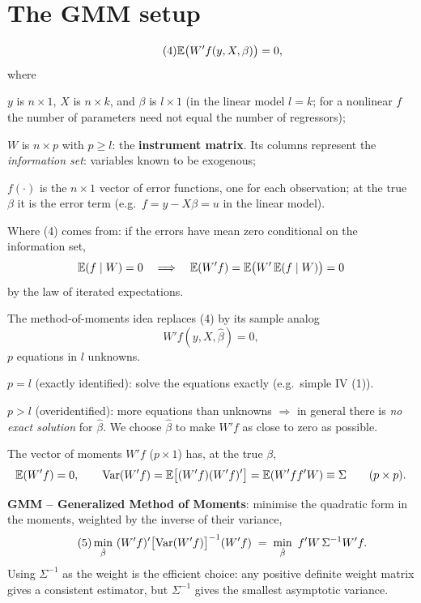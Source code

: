 \documentclass[11pt]{article}
\begin{document}
\section{The GMM setup}

\begin{equation}\tag{4}
 \mathbb{E}\bigl(W'f(y,X,\beta)\bigr)=0 ,
\end{equation}
where
\begin{flatlist}
 \item $y$ is $n\times1$, $X$ is $n\times k$, and $\beta$ is $l\times1$ (in the linear model $l=k$; for a
       nonlinear $f$ the number of parameters need not equal the number of regressors);
 \item $W$ is $n\times p$ with $p\ge l$: the \textbf{instrument matrix}. Its columns represent the
       \emph{information set}: variables known to be exogenous;
 \item $f(\cdot)$ is the $n\times1$ vector of error functions, one for each observation; at the true $\beta$ it is
       the error term (e.g.\ $f=y-X\beta=u$ in the linear model).
\end{flatlist}
Where (4) comes from: if the errors have mean zero conditional on the information set,
\[ \mathbb{E}(f\mid W)=0\quad\Longrightarrow\quad \mathbb{E}(W'f)=\mathbb{E}\bigl(W'\,\mathbb{E}(f\mid W)\bigr)=0 \]
by the law of iterated expectations.

The method-of-moments idea replaces (4) by its sample analog
\[ W'f(y,X,\hat\beta)=0 , \]
$p$ equations in $l$ unknowns.
\begin{flatlist}
 \item $p=l$ (exactly identified): solve the equations exactly (e.g.\ simple IV (1)).
 \item $p>l$ (overidentified): more equations than unknowns $\Longrightarrow$ in general there is \emph{no
       exact solution} for $\hat\beta$. We choose $\hat\beta$ to make $W'f$ as close to zero as possible.
\end{flatlist}

The vector of moments $W'f$ ($p\times1$) has, at the true $\beta$,
\[ \mathbb{E}(W'f)=0,\qquad
   \operatorname{Var}(W'f)=\mathbb{E}\bigl[(W'f)(W'f)'\bigr]=\mathbb{E}(W'ff'W)\equiv\Sigma\qquad(p\times p). \]

\textbf{GMM -- Generalized Method of Moments}: minimise the quadratic form in the moments, weighted by the
inverse of their variance,
\begin{equation}\tag{5}
 \min_{\hat\beta}\ (W'f)'\bigl[\operatorname{Var}(W'f)\bigr]^{-1}(W'f)
 \;=\;\min_{\hat\beta}\ f'W\,\Sigma^{-1}W'f .
\end{equation}
Using $\Sigma^{-1}$ as the weight is the efficient choice: any positive definite weight matrix gives a
consistent estimator, but $\Sigma^{-1}$ gives the smallest asymptotic variance.
\end{document}
